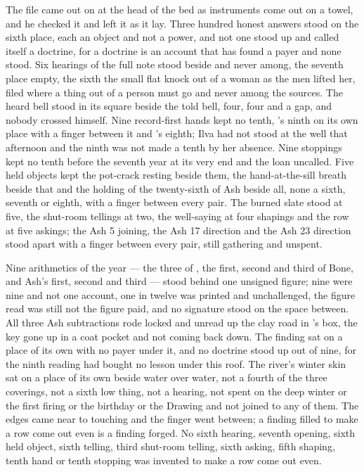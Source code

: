 The file came out on  at the head of the bed as instruments come out on a towel, and he checked it and left it as it lay. Three hundred honest answers stood on the sixth place, each an object and not a power, and not one stood up and called itself a doctrine, for a doctrine is an account that has found a payer and none stood. Six hearings of the full note stood beside and never among, the seventh place empty, the sixth the small flat knock out of a woman as the men lifted her, filed where a thing out of a person must go and never among the sources. The heard bell stood in its square beside the told bell, four, four and a gap, and nobody crossed himself. Nine record-first hands kept no tenth, 's ninth on its own place with a finger between it and 's eighth; Ilva had not stood at the well that afternoon and the ninth was not made a tenth by her absence. Nine stoppings kept no tenth before the seventh year at its very end and the loan uncalled. Five held objects kept the pot-crack resting beside them, the hand-at-the-sill breath beside that and the holding of the twenty-sixth of Ash beside all, none a sixth, seventh or eighth, with a finger between every pair. The burned slate stood at five, the shut-room tellings at two, the well-saying at four shapings and the row at five askings; the Ash 5 joining, the Ash 17 direction and the Ash 23 direction stood apart with a finger between every pair, still gathering and unspent.

Nine arithmetics of the year --- the three of , the first, second and third of Bone, and Ash's first, second and third --- stood behind one unsigned figure; nine were nine and not one account, one in twelve was printed and unchallenged, the figure read was still not the figure paid, and no signature stood on the space between. All three Ash subtractions rode locked and unread up the clay road in 's box, the key gone up in a coat pocket and not coming back down. The finding sat on a place of its own with no payer under it, and no doctrine stood up out of nine, for the ninth reading had bought no lesson under this roof. The river's winter skin sat on a place of its own beside water over water, not a fourth of the three coverings, not a sixth low thing, not a hearing, not spent on the deep winter or the first firing or the birthday or the Drawing and not joined to any of them. The edges came near to touching and the finger went between; a finding filled to make a row come out even is a finding forged. No sixth hearing, seventh opening, sixth held object, sixth telling, third shut-room telling, sixth asking, fifth shaping, tenth hand or tenth stopping was invented to make a row come out even.

